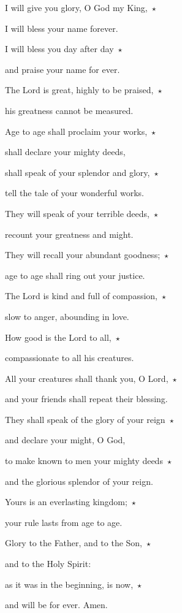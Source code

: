 \noindent I will give you glory, O God my King,~$\star$~\nopagebreak

I will bless your name forever.

\noindent I will bless you day after day~$\star$~\nopagebreak

and praise your name for ever.

\noindent The Lord is great, highly to be praised,~$\star$~\nopagebreak

his greatness cannot be measured.

\noindent Age to age shall proclaim your works,~$\star$~\nopagebreak

shall declare your mighty deeds,

\noindent shall speak of your splendor and glory,~$\star$~\nopagebreak

tell the tale of your wonderful works.

\noindent They will speak of your terrible deeds,~$\star$~\nopagebreak

recount your greatness and might.

\noindent They will recall your abundant goodness;~$\star$~\nopagebreak

age to age shall ring out your justice.

\noindent The Lord is kind and full of compassion,~$\star$~\nopagebreak

slow to anger, abounding in love.

\noindent How good is the Lord to all,~$\star$~\nopagebreak

compassionate to all his creatures.

\noindent All your creatures shall thank you, O Lord,~$\star$~\nopagebreak

and your friends shall repeat their blessing.

\noindent They shall speak of the glory of your reign~$\star$~\nopagebreak

and declare your might, O God,

\noindent to make known to men your mighty deeds~$\star$~\nopagebreak

and the glorious splendor of your reign.

\noindent Yours is an everlasting kingdom;~$\star$~\nopagebreak

your rule lasts from age to age.

\noindent Glory to the Father, and to the Son,~$\star$~\nopagebreak

and to the Holy Spirit:

\noindent as it was in the beginning, is now,~$\star$~\nopagebreak

and will be for ever. Amen.

